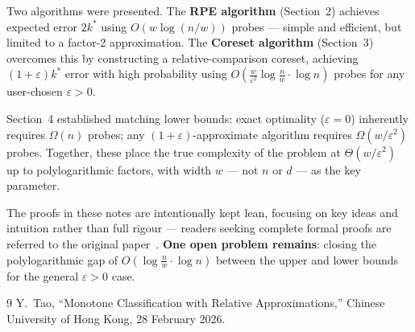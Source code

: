 \documentclass[11pt, a4paper]{article}
\theoremstyle{boxed}
\begin{document}
Two algorithms were presented. The \textbf{RPE algorithm} (Section~2) achieves expected error $2k^*$ using $O(w \log(n/w))$ probes — simple and efficient, but limited to a factor-2 approximation. The \textbf{Coreset algorithm} (Section~3) overcomes this by constructing a relative-comparison coreset, achieving $(1+\varepsilon)k^*$ error with high probability using $O\!\left(\frac{w}{\varepsilon^2}\log\frac{n}{w}\cdot\log n\right)$ probes for any user-chosen $\varepsilon > 0$.

Section~4 established matching lower bounds: exact optimality ($\varepsilon = 0$) inherently requires $\Omega(n)$ probes; any $(1+\varepsilon)$-approximate algorithm requires $\Omega(w/\varepsilon^2)$ probes. Together, these place the true complexity of the problem at $\Theta(w/\varepsilon^2)$ up to polylogarithmic factors, with width $w$ — not $n$ or $d$ — as the key parameter.

\medskip\noindent
The proofs in these notes are intentionally kept lean, focusing on key ideas and intuition rather than full rigour — readers seeking complete formal proofs are referred to the original paper~\cite{tao26}. \textbf{One open problem remains}: closing the polylogarithmic gap of $O\!\left(\log\frac{n}{w}\cdot\log n\right)$ between the upper and lower bounds for the general $\varepsilon > 0$ case.

\begin{thebibliography}{9}
   Y.~Tao, ``Monotone Classification with Relative Approximations,'' Chinese University of Hong Kong, 28 February 2026.
\end{thebibliography}
\end{document}
